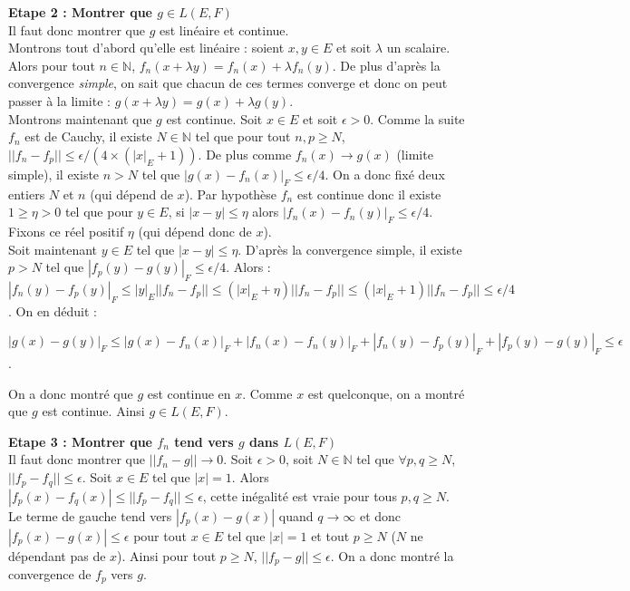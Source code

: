 \documentclass[12pt]{article}
\newcommand{\NN}{\mathbb{N}}
\begin{document}
\textbf{Etape 2 : Montrer que $g \in L(E,F)$}\\
Il faut donc montrer que $g$ est lin\'eaire et continue.\\
 Montrons tout d'abord qu'elle est lin\'eaire : soient $x,y\in E$ et soit $\lambda$ un scalaire. Alors pour tout $n \in \NN$, $f_n (x + \lambda y) = f_n (x) + \lambda f_n (y)$. De plus d'apr\`es la convergence \textit{simple}, on sait que chacun de ces termes converge et donc on peut passer \`a la limite : $g (x + \lambda y) = g (x) + \lambda g (y)$.\\
 Montrons maintenant que $g$ est continue. Soit $x \in E$ et soit $\epsilon >0$. Comme la suite  $f_n$ est de Cauchy, il existe $N \in \NN$ tel que pour tout $n,p \geq N$, $||f_n -f_p||\leq \epsilon/(4\times (|x|_E +1))$. De plus comme $f_n (x) \longrightarrow g(x)$ (limite simple), il existe $n >N$ tel que $|g(x) - f_n (x)|_F \leq \epsilon/4$. On a donc fix\'e deux entiers $N$ et $n$ (qui d\'epend de $x$). Par hypoth\`ese $f_n$ est continue donc il existe $1\geq\eta >0$ tel que pour $y \in E$, si $|x-y|\leq \eta$ alors $|f_n (x) - f_n (y)|_F \leq \epsilon/4$. Fixons ce r\'eel positif $\eta$ (qui d\'epend donc de $x$). \\
 Soit maintenant $y \in E$ tel que $|x-y|\leq \eta$. D'apr\`es la convergence simple, il existe $p > N$ tel que $|f_p (y) - g(y)|_F \leq \epsilon/4$. Alors : \\
 $|f_n (y) - f_p (y)|_F \leq |y|_E ||f_n - f_p ||  \leq (|x|_E +\eta)||f_n - f_p ||  \leq (|x|_E +1)||f_n - f_p ||\leq \epsilon/4$. On en d\'eduit :
 
 $|g(x) - g(y)|_F \leq |g(x) - f_n (x)|_F + |f_n (x) - f_n (y)|_F +  |f_n (y) - f_p (y)|_F + |f_p (y) - g(y)|_F \leq \epsilon$.

On a donc montr\'e que $g$ est continue en $x$. Comme $x$ est quelconque, on a montr\'e que $g$ est continue. Ainsi $g \in  L(E,F)$.

\textbf{Etape 3 : Montrer que $f_n$ tend vers $g $ dans $ L(E,F)$}\\
Il faut donc montrer que $||f_n - g|| \longrightarrow 0$. Soit $\epsilon >0$, soit $N \in \NN$ tel que $\forall p,q \geq N$, $||f_p - f_q || \leq \epsilon$.
 Soit $x \in E$ tel que $|x|=1$. Alors $|f_p (x) - f_q (x)| \leq ||f_p - f_q || \leq \epsilon$, cette in\'egalit\'e est vraie pour tous $p,q \geq N$. Le terme de gauche tend vers $|f_p (x) - g (x)|$ quand $q \longrightarrow \infty$ et donc $|f_p (x) - g(x)| \leq \epsilon$ pour tout $x \in E$ tel que $|x|=1$ et tout $p \geq N$ ($N$ ne d\'ependant pas de $x$). Ainsi pour tout $p \geq N$, $||f_p - g || \leq \epsilon$. On a donc montr\'e la convergence de $f_p$ vers $g$.
\end{document}
